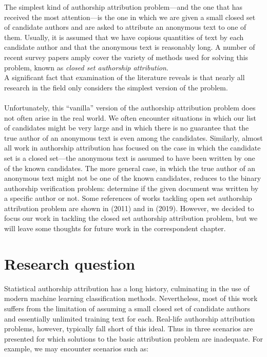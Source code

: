 The simplest kind of authorship attribution problem—and the one that has received the most attention—is the one in which we are given a small closed set of candidate authors and are asked to attribute an anonymous text to one of them. Usually, it is assumed that we have copious quantities of text by each candidate author and that the anonymous text is reasonably long. A number of recent survey papers amply cover the variety of methods used for solving this problem, known as \textit{closed set authorship attribution}.\\
A significant fact that examination of the literature reveals is that nearly all research in the field only considers the simplest version of the problem.\\\\
Unfortunately, this “vanilla” version of the authorship attribution problem does not often arise in the real world. We often encounter situations in which our list of candidates might be very large and in which there is no guarantee that the true author of an anonymous text is even among the candidates. \cite{koppel2012fundamental}
Similarly, almost all work in authorship attribution has focused on the case in which the candidate set is a closed set—the anonymous text is assumed to have been written by one of the known candidates. The more general case, in which the true author of an anonymous text might not be one of the known candidates, reduces to the binary authorship verification problem: determine if the given document was written by a specific author or not.
Some references of works tackling open set authorship attribution problem are shown in \citeauthor{koppel2011authorship} (2011) and in \citeauthor{badirli2019open} (2019).
However, we decided to focus our work in tackling the closed set authorship attribution problem, but we will leave some thoughts for future work in the correspondent chapter.


\section{Research question}

Statistical authorship attribution has a long history, culminating in the use of modern machine learning classification methods. Nevertheless, most of this work suffers from the limitation of assuming a small closed set of candidate authors and essentially unlimited training text for each. Real-life authorship attribution problems, however, typically fall short of this ideal. Thus in \cite{koppel2009computational} three scenarios are presented for which solutions to the basic attribution problem are inadequate.
For example, we may encounter scenarios such as:

